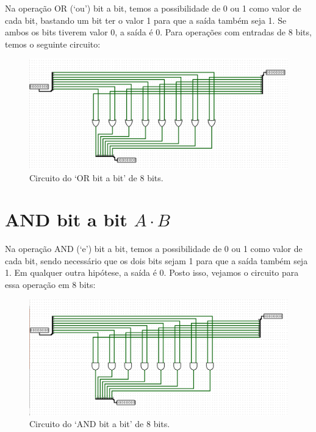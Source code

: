 \documentclass[
	12pt,				%
	openright,			%
	twoside,			%
	a4paper,			%
	english,			%
	french,				%
	spanish,			%
	brazil,				%
	]{abntex2}
\begin{document}
Na operação OR (‘ou’) bit a bit, temos a possibilidade de 0 ou 1 como valor de cada bit, bastando um bit ter o valor 1 para que a saída também seja 1. Se ambos os bits tiverem valor 0, a saída é 0. Para operações com entradas de 8 bits, temos o seguinte circuito:

\begin{figure}[H]
	\begin{center}
	    \includegraphics[scale=0.4]{imagens/or8b.png}
	\end{center}
\caption{\label{or}Circuito do ‘OR bit a bit’ de 8 bits.}
\end{figure}

\section{AND bit a bit \texorpdfstring{$A\cdot B$}{Lg}}

Na operação AND (‘e’) bit a bit, temos a possibilidade de 0 ou 1 como valor de cada bit, sendo necessário que os dois bits sejam 1 para que a saída também seja 1. Em qualquer outra hipótese, a saída é 0. Posto isso, vejamos o circuito para essa operação em 8 bits:

\begin{figure}[H]
	\begin{center}
	    \includegraphics[scale=0.4]{imagens/and8b.png}
	\end{center}
\caption{\label{and}Circuito do ‘AND bit a bit’ de 8 bits.}
\end{figure}
\end{document}
